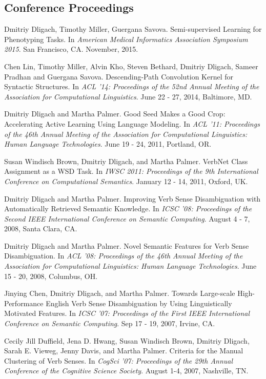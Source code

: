 \documentclass[letterpaper]{article}
\renewenvironment{itemize}{
  \begin{list}{}{
    \setlength{\leftmargin}{1.5em}
  }
}{
  \end{list}
}
\begin{document}
\subsection*{Conference Proceedings}

\begin{itemize}
\item Dmitriy Dligach, Timothy Miller, Guergana Savova. Semi-supervised Learning for Phenotyping Tasks. In \emph{American Medical Informatics Association Symposium 2015}. San Francisco, CA. November, 2015.
\item Chen Lin, Timothy Miller, Alvin Kho, Steven Bethard, Dmitriy Dligach, Sameer Pradhan and Guergana Savova. Descending-Path Convolution Kernel for Syntactic Structures. In \emph {ACL '14: Proceedings of the 52nd Annual Meeting of the Association for Computational Linguistics}. June 22 - 27, 2014, Baltimore, MD.
\item Dmitriy Dligach and Martha Palmer. Good Seed Makes a Good Crop: Accelerating Active Learning Using Language Modeling. In \emph {ACL '11: Proceedings of the 46th Annual Meeting of the Association for Computational Linguistics: Human Language Technologies}. June 19 - 24, 2011, Portland, OR. 
\item Susan Windisch Brown, Dmitriy Dligach, and Martha Palmer. VerbNet Class Assignment as a WSD Task. In \emph {IWSC 2011: Proceedings of the 9th International Conference on Computational Semantics}. January 12 - 14, 2011, Oxford, UK. 
\item Dmitriy Dligach and Martha Palmer. Improving Verb Sense Disambiguation with Automatically Retrieved Semantic Knowledge. In \emph {ICSC '08: Proceedings of the Second IEEE International Conference on Semantic Computing}. August 4 - 7, 2008, Santa Clara, CA.
\item Dmitriy Dligach and Martha Palmer. Novel Semantic Features for Verb Sense Disambiguation. In \emph {ACL '08: Proceedings of the 46th Annual Meeting of the Association for Computational Linguistics: Human Language Technologies}. June 15 - 20, 2008, Columbus, OH. 
\item Jinying Chen, Dmitriy Dligach, and Martha Palmer. Towards Large-scale High-Performance English Verb Sense Disambiguation by Using Linguistically Motivated Features. In \emph {ICSC '07: Proceedings of the First IEEE International Conference on Semantic Computing}. Sep 17 - 19, 2007, Irvine, CA.
\item Cecily Jill Duffield, Jena D. Hwang, Susan Windisch Brown, Dmitriy Dligach, Sarah E. Vieweg, Jenny Davis, and Martha Palmer. Criteria for the Manual Clustering of Verb Senses. In \emph {CogSci '07: Proceedings of the 29th Annual Conference of the Cognitive Science Society}. August 1-4, 2007, Nashville, TN.
\end{itemize}
\end{document}
